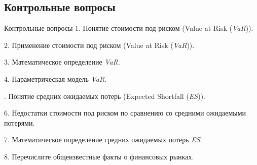 \documentclass[_fin_decisions_lectures.tex]{subfiles}
\begin{document}
\subsection{Контрольные вопросы}
\begin{frame}[allowframebreaks]{Контрольные вопросы}
1. Понятие стоимости под риском (Value at Risk (\textit{VaR})).

2. Применение стоимости под риском (Value at Risk (\textit{VaR})).

3. Математическое определение \textit{VaR}.

4. Параметрическая модель \textit{VaR}.

. Понятие средних ожидаемых потерь (Expected Shortfall (\textit{ES})).

6. Недостатки стоимости под риском по сравнению со средними ожидаемыми потерями.

7. Математическое определение средних ожидаемых потерь \textit{ES}.

8. Перечислите общеизвестные факты о финансовых рынках.
\end{frame}

\end{document}
